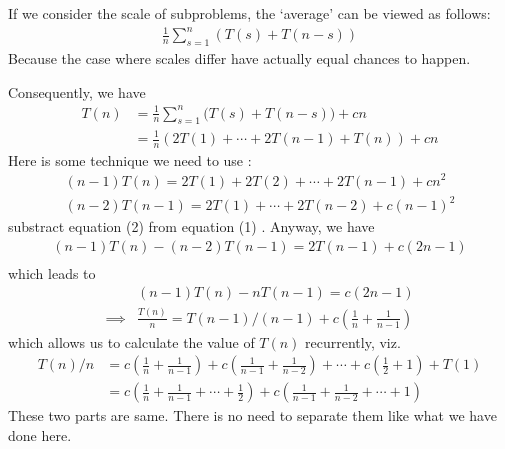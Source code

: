 \documentclass[a4paper, 10pt]{ctexart} %
\begin{document}
If we consider the scale of subproblems, the `average' can be viewed as follows:
\begin{align*}
    \frac{1}{n} \sum_{s=1} ^{n} \left(T\left(s\right) + T \left(n  -s\right)\right) 
\end{align*}
Because the case where scales differ have actually equal chances to happen. 

Consequently, we have 
\begin{align*}
    T\left(n\right) & = \frac{1}{n} \sum_{ s = 1}  ^{n} \Big(T\left(s\right) + T\left( n -s\right)\Big) + cn\\
    & = \frac{1}{n} \left( 2 T \left(1\right) + \cdots  + 2 T\left( n -1\right) + T \left(n\right) \right) + cn
\end{align*}
Here is some technique we need to use : 
\begin{align*}
    \left(n  - 1\right) T\left(n\right) =  2 T\left(1 \right)  + 2 T\left(2\right)  +\cdots  + 2 T\left(n-1\right) + c n^{2} \tag{1} \\
    \left(n-2\right)  T\left(n - 1\right) =  2 T\left(1\right) + \cdots  + 2 T\left( n  -2   \right) + c \left(n - 1\right) ^{2} \tag{2} 
\end{align*}
substract equation (2) from equation (1) . Anyway, we have 
\begin{align*}
    \left(n  - 1\right) T\left(n\right)  -  \left(n  -2\right)  T\left( n -1\right)  = 2 T\left(n - 1\right) +c \left(2 n - 1\right)  \\
\end{align*}
which leads to 
\begin{align*}
    & \left(n - 1\right) T\left(n\right)   - n T\left( n -1\right) = c \left( 2n -1 \right) \\
    \implies & \frac{T\left(n\right) }{ n}  = T\left( n-1   \right) / \left(  n -1\right) + c \left( \frac{1}{n} + \frac{1}{n-1}\right)
\end{align*}
which allows us to calculate the value of $T\left(n\right) $ recurrently, viz. 
\begin{align*}
    T \left(n\right) / n & = c \left( \frac{1}{n} + \frac{1}{n -1} \right) + c \left( \frac{1}{n-1} + \frac{1}{n-2} \right) + \cdots  + c \left(\frac{1}{2} + 1 \right) + T (1 ) \\
    & = c \left( \frac{1}{n } + \frac{1}{n-1    } + \cdots + \frac{1}{2} \right) + c \left( \frac{1}{n-1} + \frac{1}{n-2} + \cdots   + 1\right) 
\end{align*}
These two parts are same. There is no need to separate them like what we have done here.
\end{document}
